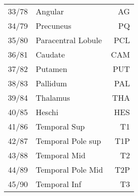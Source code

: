 \begin{table}[htbp]
\begin{center}
\begin{tabular}{ l | l | r }
33/78 & Angular               &   AG\\
34/79 & Precuneus             &   PQ\\
35/80 & Paracentral Lobule    & PCL\\
36/81 & Caudate               & CAM\\
37/82 & Putamen               & PUT\\
38/83 & Pallidum              &  PAL\\
39/84 & Thalamus              & THA\\
40/85 & Heschi                &  HES\\
41/86 & Temporal Sup          &    T1\\
42/87 & Temporal Pole sup     &  T1P\\
43/88 & Temporal Mid          &    T2\\
44/89 & Temporal Pole Mid     &  T2P\\
45/90 & Temporal Inf          &    T3\\
\hline  
  \hline 
 
\end{tabular}
\label{table:AAL Description}
\end{center}
\end{table}	


